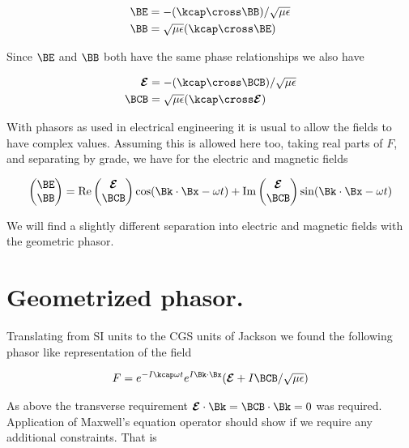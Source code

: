 \begin{align}\label{eqn:fooD}
\BE &= -(\kcap \cross \BB)/\sqrt{\mu\epsilon} \\
\BB &= \sqrt{\mu\epsilon} (\kcap \cross \BE)
\end{align}

Since $\BE$ and $\BB$ both have the same phase relationships we also have 

\begin{align}\label{eqn:fooDD}
\EE &= -(\kcap \cross \BCB)/\sqrt{\mu\epsilon} \\
\BCB &= \sqrt{\mu\epsilon} (\kcap \cross \EE)
\end{align}

With phasors as used in electrical engineering it is usual to allow the fields to have complex values.  Assuming this is allowed here too, taking real parts of $F$, and separating by grade, we have for the electric and magnetic fields

\begin{align}\label{eqn:fooX}
\begin{pmatrix}
\BE \\
\BB
\end{pmatrix}
=
\Real
\begin{pmatrix}
\EE \\
\BCB
\end{pmatrix}
\cos(\Bk \cdot \Bx - \omega t)
+\Imag
\begin{pmatrix}
\EE \\
\BCB
\end{pmatrix}
\sin(\Bk \cdot \Bx - \omega t)
\end{align}

We will find a slightly different separation into electric and magnetic fields with the geometric phasor.

\section{Geometrized phasor.}

Translating from SI units to the CGS units of Jackson we found the following phasor like representation of the field

\begin{align}\label{eqn:fooE}
F = e^{ -I \kcap \omega t } e^{ I \Bk \cdot \Bx } (\EE + I\BCB/\sqrt{\mu\epsilon})
\end{align}

As above the transverse requirement $\EE \cdot \Bk = \BCB \cdot \Bk = 0$ was required.  Application of Maxwell's equation operator should show if we require any additional constraints.  That is

